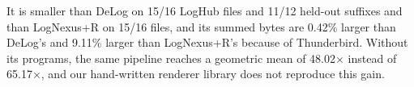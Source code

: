 It is smaller than DeLog on 15/16 LogHub files and 11/12 held-out suffixes and than LogNexus+R on 15/16 files, and its summed bytes are 0.42\% larger than DeLog's and 9.11\% larger than LogNexus+R's because of Thunderbird. Without its programs, the same pipeline reaches a geometric mean of 48.02$\times$ instead of 65.17$\times$, and our hand-written renderer library does not reproduce this gain.
